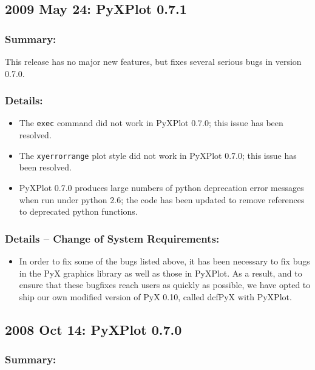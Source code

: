 \subsection*{2009 May 24: PyXPlot 0.7.1}

\subsubsection*{Summary:}

This release has no major new features, but fixes several serious bugs in version 0.7.0.

\subsubsection*{Details:}

\begin{itemize}
\item The {\tt exec} command did not work in PyXPlot 0.7.0; this issue has been resolved.
\item The {\tt xyerrorrange} plot style did not work in PyXPlot 0.7.0; this issue has been resolved.
\item PyXPlot 0.7.0 produces large numbers of python deprecation error messages when run under python 2.6; the code has been updated to remove references to deprecated python functions.
\end{itemize}

\subsubsection*{Details -- Change of System Requirements:}

\begin{itemize}
\item In order to fix some of the bugs listed above, it has been necessary to
fix bugs in the PyX graphics library as well as those in PyXPlot. As a result,
and to ensure that these bugfixes reach users as quickly as possible, we have
opted to ship our own modified version of PyX 0.10, called dcfPyX with PyXPlot.
\end{itemize}

\subsection*{2008 Oct 14: PyXPlot 0.7.0}

\subsubsection*{Summary:}

